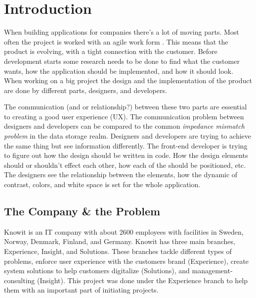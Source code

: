 \section{Introduction}




When building applications for companies there's a lot of moving parts. Most often the project is worked with an agile work form \cite{cohen2004introduction}. This means that the product is evolving, with a tight connection with the customer. Before development starts some research needs to be done to find what the customer wants, how the application should be implemented, and how it should look. When working on a big project the design and the implementation of the product are done by different parts, designers, and developers. 

The communication (and or relationship?) between these two parts are essential to creating a good user experience (UX). The communication problem between designers and developers can be compared to the common \textit{impedance mismatch problem} in the data storage realm. Designers and developers are trying to achieve the same thing but see information differently. The front-end developer is trying to figure out how the design should be written in code. How the design elements should or shouldn't effect each other, how each of the should be positioned, etc. The designers see the relationship between the elements, how the dynamic of contrast, colors, and white space is set for the whole application. 






\subsection{The Company \& the Problem}
Knowit is an IT company with about 2600 employees with facilities in Sweden, Norway, Denmark, Finland, and Germany. Knowit has three main branches, Experience, Insight, and Solutions. These branches tackle different types of problems, enforce user experience with the customers brand (Experience), create system solutions to help customers digitalize (Solutions), and management-consulting (Insight). This project was done under the Experience branch to help them with an important part of initiating projects.

